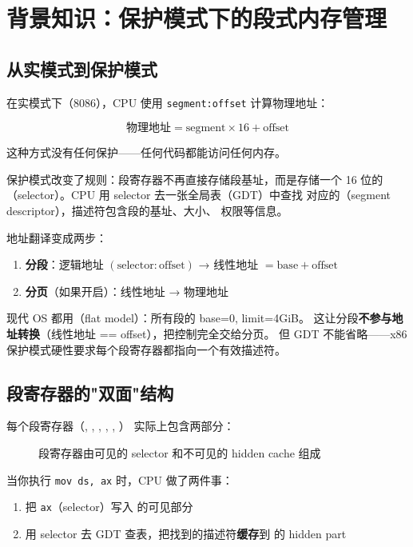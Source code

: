 \section{背景知识：保护模式下的段式内存管理}

\subsection{从实模式到保护模式}

在实模式下（8086），CPU 使用 \texttt{segment:offset} 计算物理地址：

$$\text{物理地址} = \text{segment} \times 16 + \text{offset}$$

这种方式没有任何保护——任何代码都能访问任何内存。

保护模式改变了规则：段寄存器不再直接存储段基址，而是存储一个 16 位的
（selector）。CPU 用 selector 去一张全局表（GDT）中查找
对应的（segment descriptor），描述符包含段的基址、大小、
权限等信息。

地址翻译变成两步：
\begin{enumerate}
  \item \textbf{分段}：逻辑地址 $(\text{selector}:\text{offset})$ → 线性地址 $= \text{base} + \text{offset}$
  \item \textbf{分页}（如果开启）：线性地址 → 物理地址
\end{enumerate}

\begin{whybox}
现代 OS 都用（flat model）：所有段的 base=0, limit=4GiB。
这让分段\textbf{不参与地址转换}（线性地址 == offset），把控制完全交给分页。
但 GDT 不能省略——x86 保护模式硬性要求每个段寄存器都指向一个有效描述符。
\end{whybox}

\subsection{段寄存器的"双面"结构}

每个段寄存器（, , , , , ）
实际上包含两部分：

\begin{figure}[H]
  \centering
  
  \caption{段寄存器由可见的 selector 和不可见的 hidden cache 组成}
\end{figure}

当你执行 \texttt{mov ds, ax} 时，CPU 做了两件事：
\begin{enumerate}
  \item 把 \texttt{ax}（selector）写入  的可见部分
  \item 用 selector 去 GDT 查表，把找到的描述符\textbf{缓存}到  的 hidden part
\end{enumerate}

